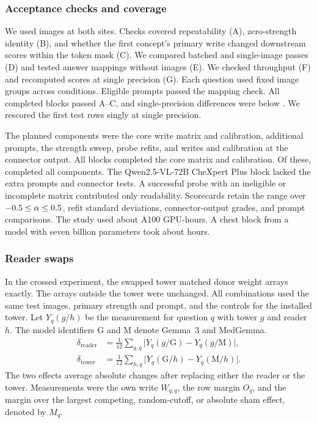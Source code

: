 \subsubsection{Acceptance checks and coverage}
\label{sec:gates}
\label{app:cf-gates}
\label{app:cf-coverage}

We used \cfCohortNihPreflightRows{} images at both sites. Checks covered repeatability (A), zero-strength identity (B), and whether the first concept's primary write changed downstream scores within the token mask (C). We compared batched and single-image passes (D) and tested answer mappings without images (E). We checked throughput (F) and recomputed scores at single precision (G). Each question used fixed image groups across conditions. Eligible prompts passed the mapping check. All \cfWriteBlocks{} completed blocks passed A--C, and single-precision differences were below \cfGateFpMax{}. We rescored the first \jnPrecisionRows{} test rows singly at single precision.

The \cfCoveragePlannedWord{} planned components were the core write matrix and calibration, additional prompts, the strength sweep, probe refits, and writes and calibration at the connector output. All \cfBlocks{} blocks completed the core matrix and calibration. Of these, \cfCoverageBlocksAllSeven{} completed all components. The Qwen2.5-VL-72B CheXpert Plus block lacked the extra prompts and connector tests. A successful probe with an ineligible or incomplete matrix contributed only readability. Scorecards retain the range over $-0.5\le\alpha\le 0.5$, refit standard deviations, connector-output grades, and prompt comparisons. The study used about \jnEvaluationComputeHours{} A100 GPU-hours. A chest block from a model with seven billion parameters took about \jnChestBlockHours{} hours.

\subsubsection{Reader swaps}
\label{app:cf-crossed-reader}

In the crossed experiment, the swapped tower matched \cfSwapTensors{} donor weight arrays exactly. The \cfSwapOutside{} arrays outside the tower were unchanged. All combinations used the same \cfSwapRows{} test images, primary strength and prompt, and the controls for the installed tower. Let $Y_q(g/h)$ be the measurement for question $q$ with tower $g$ and reader $h$. The model identifiers $\mathrm G$ and $\mathrm M$ denote Gemma~3 and MedGemma.
\begin{equation}
\begin{aligned}
\delta_{\text{reader}}&=\tfrac{1}{12}\sum_{g,q}
  \lvert Y_q(g/\mathrm G)-Y_q(g/\mathrm M)\rvert,\\
\delta_{\text{tower}}&=\tfrac{1}{12}\sum_{h,q}
  \lvert Y_q(\mathrm G/h)-Y_q(\mathrm M/h)\rvert.
\end{aligned}
\label{eq:crossover}
\end{equation}
The two effects average absolute changes after replacing either the reader or the tower. Measurements were the own write $W_{q,q}$, the row margin $O_q$, and the margin over the largest competing, random-cutoff, or absolute sham effect, denoted by $M_q$.

